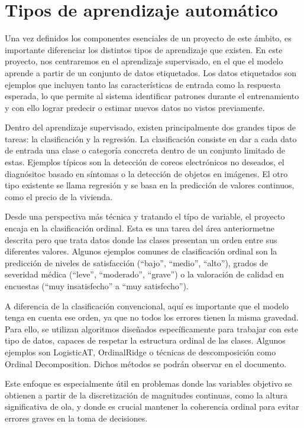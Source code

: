 \section{Tipos de aprendizaje automático}
\indent Una vez definidos los componentes esenciales de un proyecto de este ámbito, es importante diferenciar los distintos tipos de aprendizaje que existen. En este proyecto, nos centraremos en el aprendizaje supervisado, en el que el modelo aprende a partir de un conjunto de datos etiquetados. Los datos etiquetados son ejemplos que incluyen tanto las características de entrada como la respuesta esperada, lo que permite al sistema identificar patrones durante el entrenamiento y con ello lograr predecir o estimar nuevos datos no vistos previamente.

Dentro del aprendizaje supervisado, existen principalmente dos grandes tipos de tareas: la clasificación y la regresión. La clasificación consiste en dar a cada dato de entrada una clase o categoría conccreta dentro de un conjunto limitado de estas. Ejemplos típicos son la detección de coreos electrónicos no deseados, el diagnósitoc basado en síntomas o la detección de objetos en imágenes. El otro tipo existente se llama regresión y se basa en la predicción de valores continuos, como el precio de la vivienda.\vspace{1em}

\indent Desde una perspectiva más técnica y tratando el típo de variable, el proyecto encaja en la clasificación ordinal. Esta es una tarea del área anteriormetne descrita pero que trata datos donde las clases presentan un orden entre sus diferentes valores. Algunos ejemplos comunes de clasificación ordinal son la predicción de niveles de satisfacción (“bajo”, “medio”, “alto”), grados de severidad médica (“leve”, “moderado”, “grave”) o la valoración de calidad en encuestas (“muy insatisfecho” a “muy satisfecho”). 

A diferencia de la clasificación convencional, aquí es importante que el modelo tenga en cuenta ese orden, ya que no todos los errores tienen la misma gravedad. 
Para ello, se utilizan algoritmos diseñados específicamente para trabajar con este tipo de datos, capaces de respetar la estructura ordinal de las clases. Algunos ejemplos son LogisticAT, OrdinalRidge o técnicas de descomposición como Ordinal Decomposition. Dichos métodos se podrán observar en el documento. 

Este enfoque es especialmente útil en problemas donde las variables objetivo se obtienen a partir de la discretización de magnitudes continuas, como la altura significativa de ola, y donde es crucial mantener la coherencia ordinal para evitar errores graves en la toma de decisiones.

